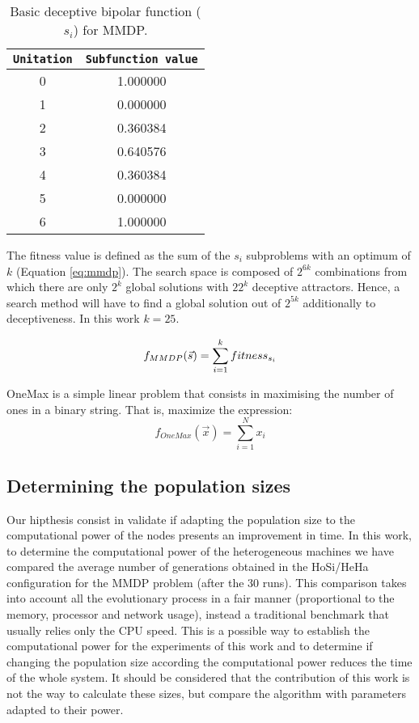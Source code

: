 \documentclass[final,1p,times]{elsarticle}
\begin{document}
\begin{table}

\centering
{%
\caption{ Basic deceptive bipolar function ($s_i$) for MMDP.}
\begin{tabular}{|c|c|}
\hline
\texttt{Unitation}&\texttt{Subfunction value}\\
\hline
0 & 1.000000 \\
\hline
1 & 0.000000 \\
\hline
2 & 0.360384 \\
\hline
3 & 0.640576\\
\hline
4 & 0.360384\\
\hline
5 & 0.000000\\
\hline
6 & 1.000000\\
\hline

\end{tabular}
}

\label{table:mmdpvalues}
\end{table}



The fitness value is defined as the sum of the $s_i$ subproblems with an optimum of $k$ (Equation \ref{eq:mmdp}).
The search space is composed of $2^{6k}$ combinations from which there
are only $2^k$ global solutions with $22^k$ deceptive
attractors. Hence, a search method will have to find a global solution
out of $2^{5k}$ additionally to deceptiveness. In this work $k=25$. 

\begin{equation}\label{eq:mmdp}
\scriptsize
f_{MMDP}(\vec s)= \sum_{i=1}^{k} fitness_{s_i}
\end{equation}

OneMax is a simple linear problem that consists in maximising the number of ones in a binary string. That is, maximize the expression:
\begin{equation}
f_{OneMax}(\vec{x}) = \sum_{i=1}^{N}{x_{i}}
\end{equation}


\subsection{Determining the population sizes} 
Our hipthesis consist in validate if adapting the population size to the computational power of the nodes presents an improvement in time. In this work, to determine the computational power of the heterogeneous machines we have compared the average number of generations obtained in the HoSi/HeHa configuration for the MMDP problem (after the 30 runs). This comparison takes into account all the evolutionary process in a fair manner (proportional to the memory, processor and network usage), instead a traditional benchmark that usually relies only the CPU speed. This is a possible way to establish the computational power for the experiments of this work and to determine if changing the population size according the computational power reduces the time of the whole system. It should be considered that the contribution of this work is not the way to calculate these sizes, but compare the algorithm with parameters adapted to their power.
\end{document}
